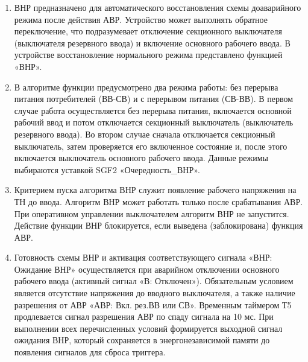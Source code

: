 
\color{black}

\begin{enumerate}

\item
ВНР предназначено для автоматического восстановления схемы доаварийного режима после действия АВР. Устройство может выполнять обратное переключение, что  подразумевает отключение секционного выключателя (выключателя резервного ввода) и включение основного рабочего ввода. В устройстве восстановление нормального режима представлено функцией «ВНР».

\item
В алгоритме функции предусмотрено два режима работы: без перерыва питания потребителей (ВВ-СВ) и с перерывом питания (СВ-ВВ). В первом случае работа осуществляется без перерыва питания, включается основной рабочий ввод и потом отключается секционный выключатель (выключатель резервного ввода). Во  втором  случае  сначала  отключается  секционный  выключатель,  затем  проверяется  его  включенное состояние и, после этого включается выключатель основного рабочего ввода. Данные режимы выбираются уставкой SGF2 «Очередность\_ВНР». 

\item
Критерием пуска алгоритма ВНР служит появление рабочего напряжения на ТН до ввода. Алгоритм ВНР может работать только после срабатывания АВР. При оперативном управлении выключателем алгоритм ВНР не запустится. Действие функции ВНР блокируется, если выведена (заблокирована) функция АВР. 

\item
Готовность  схемы  ВНР  и  активация  соответствующего  сигнала «ВНР:  Ожидание  ВНР» осуществляется при аварийном отключении основного рабочего ввода (активный сигнал «В: Отключен»). Обязательным  условием  является  отсутствие  напряжения  до  вводного  выключателя,  а  также  наличие разрешения от АВР «АВР: Вкл. рез.ВВ или СВ». Временным таймером Т5 продлевается сигнал разрешения АВР по спаду сигнала на 10 мс. При выполнении всех перечисленных условий формируется выходной сигнал  ожидания  ВНР,  который  сохраняется  в  энергонезависимой  памяти  до  появления  сигналов  для сброса триггера.


\end{enumerate}
